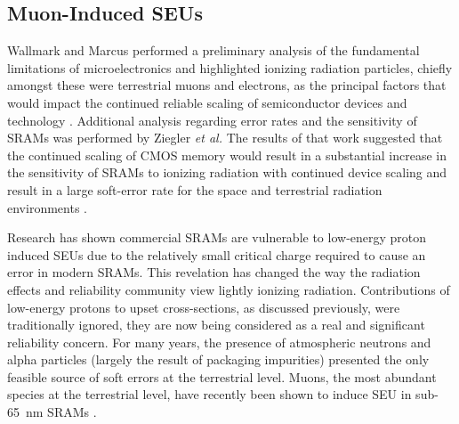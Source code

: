 \subsection{Muon-Induced SEUs} %
\label{sub:muon_induced_seus}
Wallmark and Marcus performed a preliminary analysis of the fundamental limitations of microelectronics and highlighted ionizing radiation particles, chiefly amongst these were terrestrial muons and electrons, as the principal factors that would impact the continued reliable scaling of semiconductor devices and technology \cite{Wallmark:1962vn}.
Additional analysis regarding error rates and the sensitivity of SRAMs was performed by Ziegler \emph{et al.}
The results of that work suggested that the continued scaling of CMOS memory would result in a substantial increase in the sensitivity of SRAMs to ionizing radiation with continued device scaling and result in a large soft-error rate for the space and terrestrial radiation environments \cite{Ziegler:1979vh}.

Research has shown commercial SRAMs are vulnerable to low-energy proton induced SEUs due to the relatively small critical charge required to cause an error in modern SRAMs.
This revelation has changed the way the radiation effects and reliability community view lightly ionizing radiation.
Contributions of low-energy protons to upset cross-sections, as discussed previously, were traditionally ignored, they are now being considered as a real and significant reliability concern.
For many years, the presence of atmospheric neutrons and alpha particles (largely the result of packaging impurities) presented the only feasible source of soft errors at the terrestrial level.
Muons, the most abundant species at the terrestrial level, have recently been shown to induce SEU in sub-65~nm SRAMs \cite{Sierawski:2010cj,Sierawski:2011tc,Sierawski:2011bn}.

